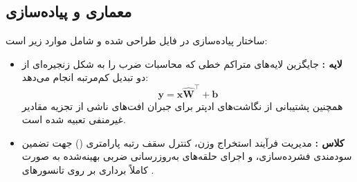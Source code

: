 \subsection{معماری و پیاده‌سازی}
ساختار پیاده‌سازی در فایل  طراحی شده و شامل موارد زیر است:
\begin{itemize}
    \item \textbf{لایه :} جایگزین لایه‌های متراکم خطی که محاسبات ضرب را به شکل زنجیره‌ای از دو تبدیل کم‌مرتبه انجام می‌دهد:
    \begin{equation}
    \mathbf{y} = \mathbf{x} \hat{\mathbf{W}}^\top + \mathbf{b}
    \end{equation}
    همچنین پشتیبانی از نگاشت‌های ادپتر  برای جبران افت‌های ناشی از تجزیه مقادیر غیرمنفی تعبیه شده است.
    \item \textbf{کلاس :} مدیریت فرآیند استخراج وزن، کنترل سقف رتبه پارامتری () جهت تضمین سودمندی فشرده‌سازی، و اجرای حلقه‌های به‌روزرسانی ضربی بهینه‌شده به صورت کاملاً برداری بر روی تانسورهای .
\end{itemize}

